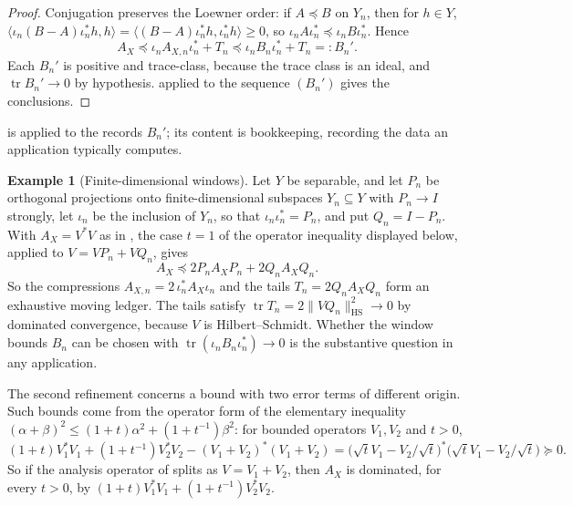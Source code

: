 \documentclass[11pt]{article}
\DeclareMathOperator{\trace}{tr}
\newcommand{\AX}{A_{X}}
\theoremstyle{definition}
\newtheorem*{example}{Example}
\begin{document}
\begin{proof}
Conjugation preserves the Loewner order: if \(A\preceq B\) on \(Y_n\),
then for \(h\in Y\),
\(\langle\iota_n(B-A)\iota_n^*h,h\rangle
=\langle(B-A)\iota_n^*h,\iota_n^*h\rangle\geq0\), so
\(\iota_nA\iota_n^*\preceq\iota_nB\iota_n^*\).  Hence
\[
  \AX\preceq\iota_nA_{X,n}\iota_n^*+T_n
  \preceq\iota_nB_n\iota_n^*+T_n=:B_n' .
\]
Each \(B_n'\) is positive and trace-class, because the trace class is
an ideal, and \(\trace B_n'\to0\) by hypothesis.
 applied to the sequence
\((B_n')\) gives the conclusions.
\end{proof}

 is
 applied to the records
\(B_n'\); its content is bookkeeping, recording the data an
application typically computes.

\begin{example}[Finite-dimensional windows]
Let \(Y\) be separable, and let \(P_n\) be orthogonal projections onto
finite-dimensional subspaces \(Y_n\subseteq Y\) with \(P_n\to I\)
strongly, let \(\iota_n\) be the
inclusion of \(Y_n\), so that \(\iota_n\iota_n^*=P_n\), and put
\(Q_n=I-P_n\).  With \(\AX=V^*V\) as in
, the case \(t=1\) of
the operator inequality displayed below, applied to
\(V=VP_n+VQ_n\), gives
\[
  \AX\preceq2P_n\AX P_n+2Q_n\AX Q_n .
\]
So the compressions \(A_{X,n}=2\,\iota_n^*\AX\iota_n\) and the tails
\(T_n=2Q_n\AX Q_n\) form an exhaustive moving ledger.  The tails
satisfy \(\trace T_n=2\|VQ_n\|_{\mathrm{HS}}^2\to0\) by dominated
convergence, because \(V\) is Hilbert--Schmidt.  Whether the window
bounds \(B_n\) can be chosen with \(\trace(\iota_nB_n\iota_n^*)\to0\) is
the substantive question in any application.
\end{example}

The second refinement concerns a bound with two error terms of
different origin.  Such bounds come from the operator form of the
elementary inequality \((\alpha+\beta)^2\leq(1+t)\alpha^2+(1+t^{-1})\beta^2\):
for bounded operators \(V_1,V_2\) and \(t>0\),
\[
  (1+t)V_1^*V_1+(1+t^{-1})V_2^*V_2-(V_1+V_2)^*(V_1+V_2)
  =\bigl(\sqrt tV_1-V_2/\sqrt t\bigr)^*\bigl(\sqrt tV_1-V_2/\sqrt t\bigr)
  \succeq0 .
\]
So if the analysis operator of 
splits as \(V=V_1+V_2\), then \(\AX\) is dominated, for every \(t>0\),
by \((1+t)V_1^*V_1+(1+t^{-1})V_2^*V_2\).
\end{document}
